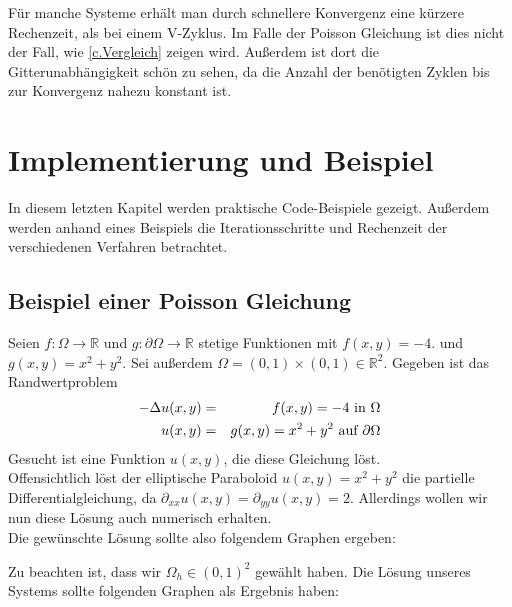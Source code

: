 Für manche Systeme erhält man durch schnellere Konvergenz eine kürzere Rechenzeit, als bei einem V-Zyklus. Im Falle der Poisson Gleichung ist dies nicht der Fall, wie \autoref{c.Vergleich} zeigen wird. Außerdem ist dort die Gitterunabhängigkeit schön zu sehen, da die Anzahl der benötigten Zyklen bis zur Konvergenz nahezu konstant ist.

\chapter{Implementierung und Beispiel}\label{c.Vergleich}

In diesem letzten Kapitel werden praktische Code-Beispiele gezeigt. Außerdem werden anhand eines Beispiels die Iterationsschritte und Rechenzeit der verschiedenen Verfahren betrachtet.

\section{Beispiel einer Poisson Gleichung}\label{s.Beispiel einer Poisson Gleichung}

Seien $f: \Omega \rightarrow \mathbb{R}$ und $g: \partial\Omega \rightarrow \mathbb{R}$ stetige Funktionen mit $f(x,y) = -4.$ und $g(x,y) = x^{2} + y^{2}$. Sei außerdem $\Omega = (0,1)\times(0,1) \in \mathbb{R}^{2}$. Gegeben ist das Randwertproblem
\begin{eqnarray}
        -\Delta u(x,y) &=& f(x,y) = -4 \textnormal{ in } \Omega \\
    u(x,y) &=& g(x,y) = x^{2} + y^{2} \textnormal{ auf } \partial \Omega
\end{eqnarray}
Gesucht ist eine Funktion $u(x,y)$, die diese Gleichung löst. \\
Offensichtlich löst der elliptische Paraboloid $u(x,y) = x^{2} + y^{2}$ die partielle Differentialgleichung, da $\partial_{xx}u(x,y) = \partial_{yy}u(x,y) = 2$. Allerdings wollen wir nun diese Lösung auch numerisch erhalten.\\
Die gewünschte Lösung sollte also folgendem Graphen ergeben:


Zu beachten ist, dass wir $\Omega_{h} \in (0,1)^{2}$ gewählt haben. Die Lösung unseres Systems sollte folgenden Graphen als Ergebnis haben:

